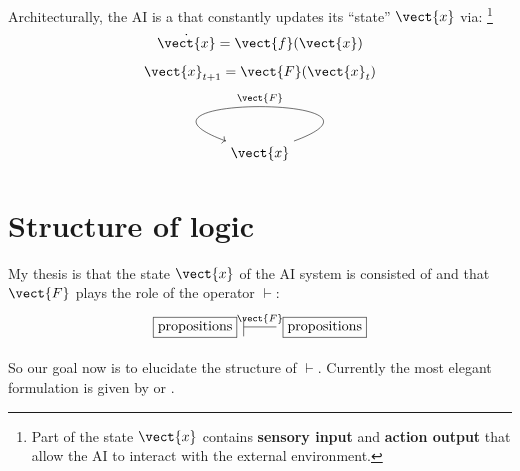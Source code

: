 Architecturally, the AI is a  that constantly updates its ``state'' $\vect{x}$ via: \footnote{Part of the state $\vect{x}$ contains \textbf{sensory input} and \textbf{action output} that allow the AI to interact with the external environment.}
\begin{equation}
\dot{\vect{x}} = \vect{f}(\vect{x})
\end{equation}
\begin{equation}
\vect{x}_{t+1} = \vect{F}(\vect{x}_t)
\end{equation}
\begin{equation}
\label{eqn:AGI-architecture}
\begin{tikzcd}
\vect{x} \arrow[in=160,out=20,loop,looseness=5,swap,"\vect{F}"]
\end{tikzcd}
\end{equation}

\section{Structure of logic}

My thesis is that the state $\vect{x}$ of the AI system is consisted of  and that $\vect{F}$ plays the role of the  operator $\vdash$:
\begin{equation}
\begin{tikzcd}[| /.tip = {Bar[scale=3]}]
\boxed{\mbox{propositions}}
\arrow[r, |-, "\vect{F}"]
& \boxed{\mbox{propositions}}
\end{tikzcd}
\end{equation}

So our goal now is to elucidate the structure of $\vdash$.  Currently the most elegant formulation is given by  or .



